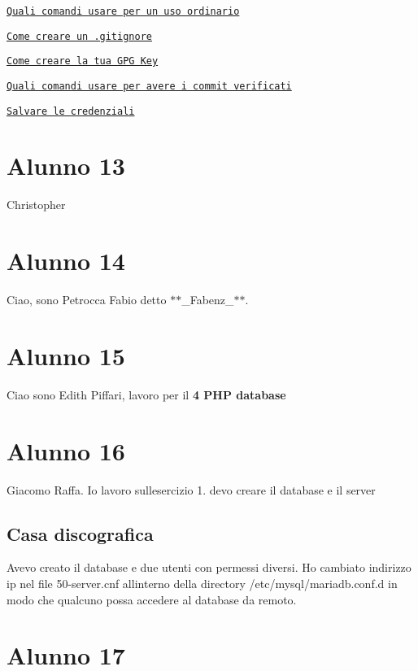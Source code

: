 \href{https://gist.github.com/simonemastella/90364ec267d65a5328bd97c23aee1864}{\tt Quali comandi usare per un uso ordinario}

\href{https://gist.github.com/simonemastella/e69cd0a0d9fe151e52c0fc53ac4ad3ea}{\tt Come creare un .gitignore}

\href{https://gist.github.com/simonemastella/2ad4f08ed6f18af7e102a8e1a573dd8d}{\tt Come creare la tua G\+PG Key}

\href{https://gist.github.com/simonemastella/3e763531b32e1db583e2dcb4fdd668a8}{\tt Quali comandi usare per avere i commit verificati}

\href{https://gist.github.com/simonemastella/ecd089c6106a961eb9272a40c5b16d5a}{\tt Salvare le credenziali} \section*{Alunno 13}

Christopher \section*{Alunno 14}

Ciao, sono Petrocca Fabio detto $\ast$$\ast$\+\_\+\+Fabenz\+\_\+$\ast$$\ast$. \section*{Alunno 15}

Ciao sono Edith Piffari, lavoro per il {\bfseries 4 P\+HP database} \section*{Alunno 16}

Giacomo Raffa. Io lavoro sull\textquotesingle{}esercizio 1. devo creare il database e il server \subsection*{Casa discografica}

Avevo creato il database e due utenti con permessi diversi. Ho cambiato indirizzo ip nel file 50-\/server.\+cnf all\textquotesingle{}interno della directory /etc/mysql/mariadb.conf.\+d in modo che qualcuno possa accedere al database da remoto.

\section*{Alunno 17}

